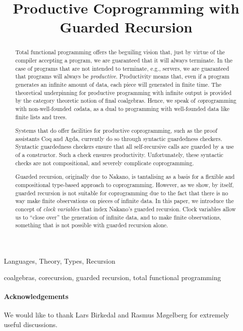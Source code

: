 \documentclass[natbib,preprint]{sigplanconf}
\title{Productive Coprogramming with Guarded Recursion}
\begin{document}
\maketitle

\begin{abstract}
  Total functional programming offers the beguiling vision that, just
  by virtue of the compiler accepting a program, we are guaranteed
  that it will always terminate. In the case of programs that are not
  intended to terminate, e.g., servers, we are guaranteed that
  programs will always be \emph{productive}. Productivity means that,
  even if a program generates an infinite amount of data, each piece
  will generated in finite time. The theoretical underpinning for
  productive programming with infinite output is provided by the
  category theoretic notion of final coalgebras. Hence, we speak of
  \emph{co}programming with non-well-founded \emph{co}data, as a dual
  to programming with well-founded data like finite lists and trees.

  Systems that do offer facilities for productive coprogramming, such
  as the proof assistants Coq and Agda, currently do so through
  syntactic guardedness checkers. Syntactic guardedness checkers
  ensure that all self-recursive calls are guarded by a use of a
  constructor. Such a check ensures productivity. Unfortunately, these
  syntactic checks are not compositional, and severely complicate
  coprogramming.

  Guarded recursion, originally due to Nakano, is tantalising as a
  basis for a flexible and compositional type-based approach to
  coprogramming. However, as we show, by itself, guarded recursion is
  not suitable for coprogramming due to the fact that there is no way
  make finite observations on pieces of infinite data. In this paper,
  we introduce the concept of \emph{clock variables} that index
  Nakano's guarded recursion. Clock variables allow us to ``close
  over'' the generation of infinite data, and to make finite
  observations, something that is not possible with guarded recursion
  alone.
\end{abstract}

  

\terms
  Languages, Theory, Types, Recursion

\keywords
  coalgebras, corecursion, guarded recursion, total functional programming





%

\paragraph{Acknowledgements} We would like to thank Lars Birkedal and
Rasmus M{\o}gelberg for extremely useful discussions.




%
\end{document}
